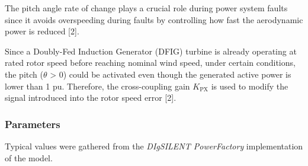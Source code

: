 \documentclass[
  a4paper,
  DIV=11,
  numbers=noendperiod]{scrartcl}
\begin{document}
The pitch angle rate of change plays a crucial role during power system
faults since it avoids overspeeding during faults by controlling how
fast the aerodynamic power is reduced {[}2{]}.

Since a Doubly-Fed Induction Generator (DFIG) turbine is already
operating at rated rotor speed before reaching nominal wind speed, under
certain conditions, the pitch (\(\theta\) \textgreater{} 0) could be
activated even though the generated active power is lower than 1 pu.
Therefore, the cross-coupling gain \(K_\mathrm{PX}\) is used to modify
the signal introduced into the rotor speed error {[}2{]}.

\subsubsection{Parameters}\label{parameters-5}

Typical values were gathered from the \emph{DIgSILENT PowerFactory}
implementation of the model.
\end{document}
